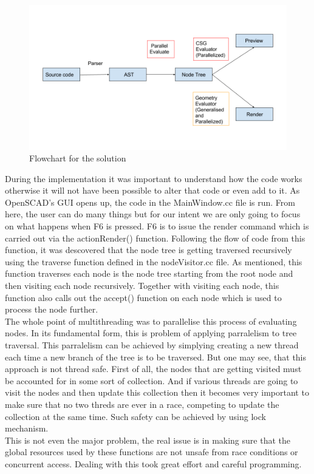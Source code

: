 \begin{figure}
    \centering 
    \includegraphics[width=\linewidth]{images/finalflow.png}
    \caption{Flowchart for the solution}
\end{figure}
During the implementation it was important to understand how the code works otherwise it will not have been possible to alter that code or even add to it. As OpenSCAD's GUI opens up, the code in the MainWindow.cc file is run. From here, the user can do many things but for our intent we are only going to focus on what happens when F6 is pressed. F6 is to issue the render command which is carried out via the actionRender() function. Following the flow of code from this function, it was descovered that the node tree is getting traversed recursively using the traverse function defined in the nodeVisitor.cc file. As mentioned, this function traverses each node is the node tree starting from the root node and then visiting each node recursively. Together with visiting each node, this function also calls out the accept() function on each node which is used to process the node further.\\
The whole point of multithreading was to parallelise this process of evaluating nodes. In its fundamental form, this is problem of applying parralelism to tree traversal. This parralelism can be achieved by simplying creating a new thread each time a new branch of the tree is to be traversed. But one may see, that this approach is not thread safe. First of all, the nodes that are getting visited must be accounted for in some sort of collection. And if various threads are going to visit the nodes and then update this collection then it becomes very important to make sure that no two threds are ever in a race, competing to update the collection at the same time. Such safety can be achieved by using lock mechanism.\\
This is not even the major problem, the real issue is in making sure that the global resources used by these functions are not unsafe from race conditions or concurrent access. Dealing with this took great effort and careful programming.
